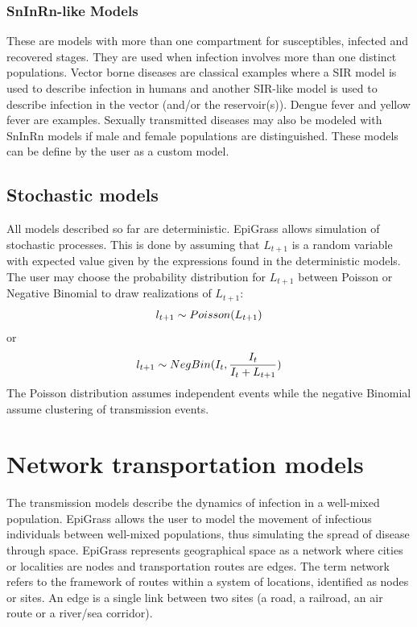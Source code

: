\documentclass[a4paper,10pt,english]{sphinxmanual}
\begin{document}
\subsubsection{SnInRn-like Models}
\label{intromodels:sninrn-like-models}
These are models with more than one compartment for susceptibles,
infected and recovered stages. They are used when infection involves
more than one distinct populations. Vector borne diseases are
classical examples where a SIR model is used to describe infection in
humans and another SIR-like model is used to describe infection in the
vector (and/or the reservoir(s)). Dengue fever and yellow fever are
examples. Sexually transmitted diseases may also be modeled with
SnInRn models if male and female populations are distinguished. These
models can be define by the user as a custom model.


\subsection{Stochastic models}
\label{intromodels:stochastic-models}
All models described so far are deterministic. EpiGrass allows simulation of stochastic processes. This is done by assuming that \(L_{t+1}\) is a random variable with expected value given by the expressions found in the deterministic models. The user may choose the probability distribution for \(L_{t+1}\) between Poisson or Negative Binomial to draw realizations of \(L_{t+1}\):
\begin{gather}
\begin{split}l_{t+1} \sim Poisson (L_{t+1})\end{split}\notag
\end{gather}
or
\begin{gather}
\begin{split}l_{t+1} \sim NegBin (I_t, \frac{I_t}{I_t+L_{t+1}})\end{split}\notag
\end{gather}
The Poisson distribution assumes independent events while the negative Binomial assume clustering of transmission events.


\section{Network transportation models}
\label{intromodels:network-transportation-models}
The transmission models describe the dynamics of infection in a well-mixed population. EpiGrass allows the user to model the movement of infectious individuals between well-mixed populations, thus simulating the spread of disease through space. EpiGrass represents geographical space as a network where cities or localities are nodes and transportation routes are edges. The term network refers to the framework of routes within a system of locations, identified as nodes or sites. An edge is a single link between two sites (a road, a railroad, an air route or a river/sea corridor).
\end{document}
